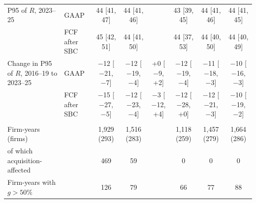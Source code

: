 \begin{table}[t]
{\begin{tabular}{llcccccc}
P95 of $R$, 2023--25 & GAAP & 44 [41, 47] & 44 [41, 46] &  & 43 [39, 45] & 44 [41, 46] & 44 [41, 45] \\
 & FCF after SBC & 45 [42, 51] & 44 [41, 50] &  & 44 [37, 53] & 44 [40, 50] & 44 [40, 49] \\
Change in P95 of $R$, 2016--19 to 2023--25 & GAAP & $-$12 [$-$21, $-$7] & $-$12 [$-$19, $-$4] & +0 [$-$9, +2] & $-$12 [$-$19, $-$4] & $-$11 [$-$18, $-$3] & $-$10 [$-$16, $-$3] \\
 & FCF after SBC & $-$15 [$-$27, $-$5] & $-$12 [$-$23, $-$4] & $-$3 [$-$12, +4] & $-$12 [$-$28, +0] & $-$12 [$-$21, $-$3] & $-$10 [$-$19, $-$2] \\
\addlinespace\multicolumn{8}{l}{\emph{C. Samples}}\\
Firm-years (firms) & & 1,929 (293) & 1,516 (283) &  & 1,118 (259) & 1,457 (279) & 1,664 (286) \\
\quad of which acquisition-affected & & 469 & 59 &  & 0 & 0 & 0 \\
Firm-years with $g>50\%$ & & 126 & 79 &  & 66 & 77 & 88 \\
\bottomrule\end{tabular}}

\end{table}
